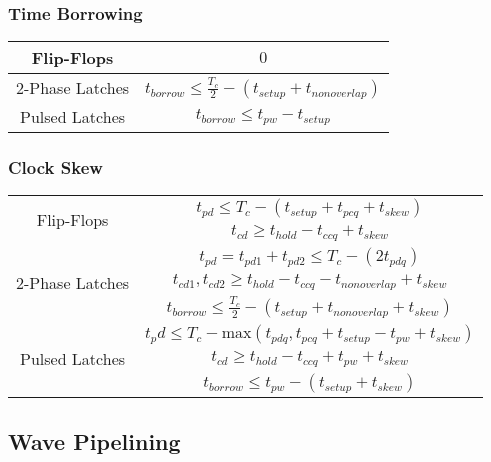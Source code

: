         \subsubsection{Time Borrowing}
        \begin{tabular}{| c | c |}
            \hline
            Flip-Flops & $0$ \\
            \hline
            2-Phase Latches & $t_{borrow} \leq \frac{T_c}{2} - (t_{setup} + t_{nonoverlap})$ \\
            \hline
            Pulsed Latches & $t_{borrow} \leq t_{pw} - t_{setup}$ \\
            \hline
        \end{tabular}

        \subsubsection{Clock Skew}
        \begin{tabular}{| c | c |}
            \hline
            \multirow{2}{4em}{Flip-Flops} & $t_{pd} \leq T_c - (t_{setup} + t_{pcq} + t_{skew})$ \\
            & $t_{cd} \geq t_{hold} - t_{ccq} + t_{skew}$\\
            \hline
            \multirow{3}{4em}{2-Phase Latches} & $t_{pd} = t_{pd1} + t_{pd2} \leq T_c - (2t_{pdq})$ \\
            & $t_{cd1},t_{cd2} \geq t_{hold} - t_{ccq} - t_{nonoverlap} + t_{skew}$\\
            & $t_{borrow} \leq \frac{T_c}{2} - (t_{setup} + t_{nonoverlap} + t_{skew})$\\
            \hline
            \multirow{3}{4em}{Pulsed Latches} & $t_pd \leq T_c - \text{max}\left( t_{pdq}, t_{pcq} + t_{setup} - t_{pw} + t_{skew}\right)$ \\
            & $t_{cd} \geq t_{hold} - t_{ccq} + t_{pw} + t_{skew}$ \\
            & $t_{borrow} \leq t_{pw} - (t_{setup} +t_{skew})$\\
            \hline
        \end{tabular}
    \subsection{Wave Pipelining}
